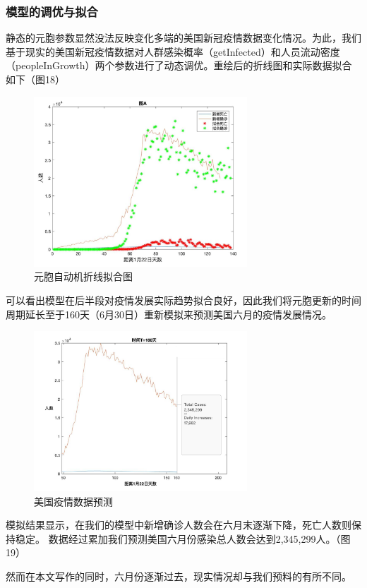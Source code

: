 \documentclass[UTF8]{ctexart}
\begin{document}
\subsubsection{模型的调优与拟合}
\par 
静态的元胞参数显然没法反映变化多端的美国新冠疫情数据变化情况。为此，我们基于现实的美国新冠疫情数据对人群感染概率（getInfected）和人员流动密度（peopleInGrowth）两个参数进行了动态调优。重绘后的折线图和实际数据拟合如下（图18）
\begin{figure}[htbp][H]
\centering
\includegraphics[width=8cm]{sim.png} 
\caption{元胞自动机折线拟合图}
\end{figure}
\par
可以看出模型在后半段对疫情发展实际趋势拟合良好，因此我们将元胞更新的时间周期延长至于160天（6月30日）重新模拟来预测美国六月的疫情发展情况。
\begin{figure}[htbp][H]
\centering
\includegraphics[width=8cm]{presim.png} 
\caption{美国疫情数据预测}
\end{figure}
\par
模拟结果显示，在我们的模型中新增确诊人数会在六月末逐渐下降，死亡人数则保持稳定。
数据经过累加我们预测美国六月份感染总人数会达到2,345,299人。（图19）
\\
\par
然而在本文写作的同时，六月份逐渐过去，现实情况却与我们预料的有所不同。
\end{document}
